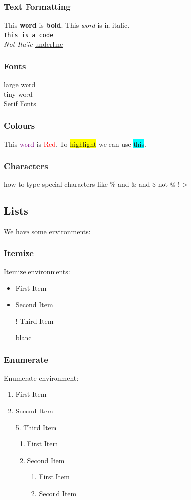 \documentclass[12pt]{article}
\begin{document}
	\subsubsection{Text Formatting}
	This \textbf{word} is \textbf{bold}. This \textit{word} is in italic.\\
	\texttt{This is a code}\\
	\textsl{Not Italic} \quad \underline{underline}
	\subsubsection{Fonts}
	{\large large word}  \\
	{\tiny tiny word} \\
	\textsf{Serif Fonts}
	\subsubsection{Colours}
	This \textcolor{purple}{word} is \textcolor{red}{Red}. To \colorbox{yellow}{highlight} we can use \colorbox{cyan}{this}.
	\subsubsection{Characters}
	how to type special characters like \% and \& and \$ not @ ! >
	\subsection{Lists}
	We have some environments:
	\subsubsection{Itemize}
	Itemize environments:
	\begin{itemize}
		\item First Item
		\item Second Item
		\item[!] Third Item
		\item[] blanc
	\end{itemize}
	\subsubsection{Enumerate}
	Enumerate environment:
	\begin{enumerate}
		\item First Item
		\item Second Item
		\item[5.] Third Item
			\begin{enumerate}
			\item First Item
			\item Second Item
				\begin{enumerate}
					\item First Item
					\item Second Item
				\end{enumerate}
			\end{enumerate}
	\end{enumerate}
\end{document}
